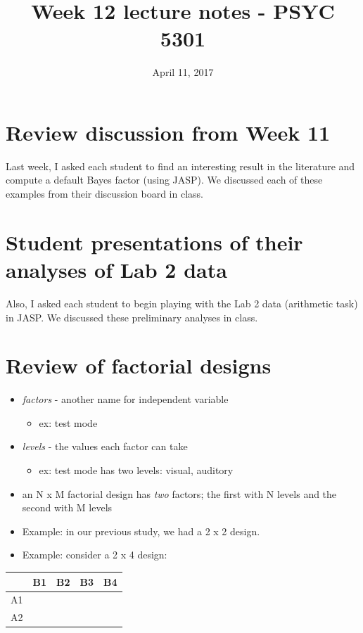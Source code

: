 \documentclass[article,10pt]{article}
\date{April 11, 2017}
\title{Week 12 lecture notes - PSYC 5301}
\begin{document}
\maketitle

\section*{Review discussion from Week 11}
\label{sec-1}

Last week, I asked each student to find an interesting result in the literature and compute a default Bayes factor (using JASP).  We discussed each of these examples from their discussion board in class.

\section*{Student presentations of their analyses of Lab 2 data}
\label{sec-2}

Also, I asked each student to begin playing with the Lab 2 data (arithmetic task) in JASP.  We discussed these preliminary analyses in class.

\section*{Review of factorial designs}
\label{sec-3}
\begin{itemize}
\item \emph{factors} - another name for independent variable
\begin{itemize}
\item ex: test mode
\end{itemize}
\item \emph{levels} - the values each factor can take
\begin{itemize}
\item ex: test mode has two levels: visual, auditory
\end{itemize}
\item an N x M factorial design has \emph{two} factors; the first with N levels and the second with M levels
\item Example: in our previous study, we had a 2 x 2 design.
\item Example: consider a 2 x 4 design:
\end{itemize}

\begin{center}
\begin{tabular}{lllll}
 & B1 & B2 & B3 & B4\\
\hline
A1 &  &  &  & \\
A2 &  &  &  & \\
\end{tabular}
\end{center}
\end{document}
